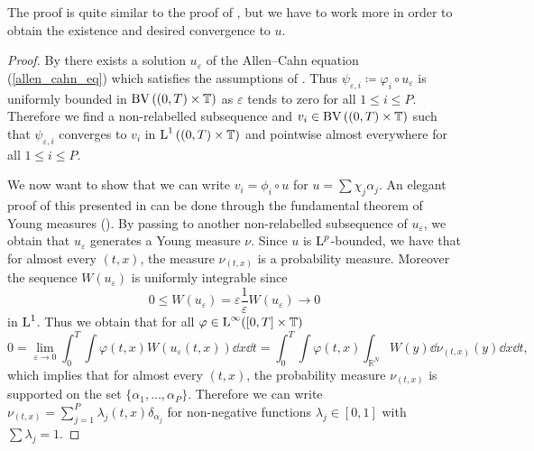 \begin{remark}
	The proof is quite similar to the proof of 
	, but we have to work more in order to 
	obtain the existence and desired convergence to $ u $.
\end{remark}

\begin{proof}
	By  there exists a solution $ u_{ 
	\varepsilon } $ of 
	the Allen--Cahn equation (\ref{allen_cahn_eq}) which satisfies the 
	assumptions of 
	.
	Thus $ \psi_{ \varepsilon, i } \coloneqq \varphi_{ i } \circ u_{ 
	\varepsilon } $ is uniformly bounded in $ \operatorname{BV} \left( ( 0 , T ) \times 
	\operatorname{\mathbb{T}} \right) $ as $ \varepsilon $ tends to zero for all $ 1 \leq i 
	\leq P $.
	Therefore we find a non-relabelled subsequence and $ v_{ i } \in 
	\operatorname{BV} \left( ( 0 , T ) \times \operatorname{\mathbb{T}} \right) $ such that $ \psi_{ 
	\varepsilon,  i } $ converges to $ v_{ i } $ in $ \operatorname{L}^{ 1 } \left( ( 0 , T 
	) 
	\times \operatorname{\mathbb{T}} \right) $ and pointwise almost everywhere for all $ 1 
	\leq i \leq P $. 
	
	We now want to show that we can write $ v_{ i } = \phi_{ i } \circ u $ for $ u = \sum \chi_{ j } \alpha_{ j } $. An elegant proof of this presented in \cite[Thm.~4.1]{fonseca_tartar_1989} can be done through the fundamental theorem of Young measures (\cite[Thm.~3.1]{Müller1999}). By passing to another non-relabelled subsequence of $ u_{ \varepsilon } $, we obtain that $ u_{ \varepsilon } $ generates a Young measure $ \nu $. Since $ u $ is $ \operatorname{L}^{ p } $-bounded, we have that for almost every $ (t, x ) $, the measure $ \nu_{ ( t, x ) } $ is a probability measure. Moreover the sequence $ W ( u_{ \varepsilon } ) $ is uniformly integrable since 
	\begin{equation*}
	 	0 \leq W ( u_{ \varepsilon } ) = \varepsilon \frac{ 1 }{ \varepsilon } 
	 	W ( u_{ \varepsilon } ) \to 0 
	 \end{equation*}
 	in $ \operatorname{L}^{ 1 } $. 
 	Thus we obtain that for all $ \varphi \in \operatorname{L}^{ \infty } ( [ 0 , T ] \times 
 	\operatorname{\mathbb{T}} ) $
 	\begin{equation*}
 		0
 		=
 		\lim_{ \varepsilon \to 0 }
 			\int_{ 0 }^{ T }
 				\int
 					\varphi (t, x )
 					W ( u_{ \varepsilon } (t, x ) )
 				\dd{ x }
 			\dd{ t }
 		=
 		\int_{ 0 }^{ T }
 			\int
 				\varphi ( t, x ) 
				\int_{ \mathbb{ R }^{ N } }
					W ( y )
				\dd{ \nu_{ ( t, x ) } ( y ) }
 			\dd{ x }
 		\dd{ t },
 	\end{equation*}
 	which implies that for almost every $ ( t, x ) $, the probability measure $ \nu_{ ( t, x ) } $ is supported on the set $ \{ \alpha_{ 1 } , \dotsc, \alpha_{ P } \} $. Therefore we can write
 	$ \nu_{ ( t , x ) } = \sum_{ j = 1 }^{ P } \lambda_{ j } ( t , x ) \delta_{ 
 	\alpha_{ j } } $ for non-negative functions $ \lambda_{ j } \in [0 ,1 ] $ 
 	with $ \sum \lambda_{ j } = 1 $.
 	

\end{proof}
